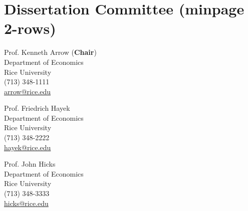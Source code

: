 \documentclass{article}[12]
\begin{document}
%
\hfill
%
%
%
\hfill
%
%

\section{Dissertation Committee (minpage 2-rows)}


\begin{minipage}{.5\textwidth}
Prof. Kenneth Arrow (\textbf{Chair}) \\
Department of Economics \\
Rice University \\
(713) 348-1111\\
\href{mailto:arrow@rice.edu}{arrow@rice.edu}
\end{minipage}%
%
%
\begin{minipage}{0.5\textwidth}
Prof. Friedrich Hayek \\
Department of Economics \\
Rice University \\
(713) 348-2222\\
\href{mailto:hayek@rice.edu}{hayek@rice.edu}
\end{minipage}

\vspace{1\baselineskip plus 10pt minus 10pt} 

\begin{minipage}{0.5\textwidth}
Prof. John Hicks \\
Department of Economics\\
Rice University \\
(713) 348-3333 \\
\href{mailto:hicks@rice.edu}{hicks@rice.edu}
\end{minipage}
\end{document}
